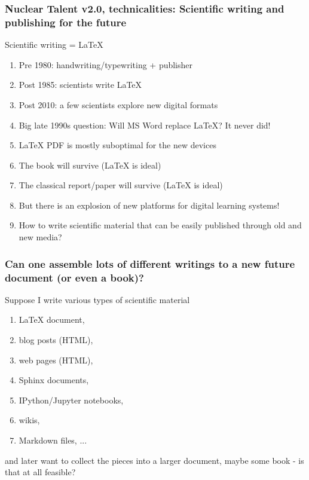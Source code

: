 \documentclass{beamer}
\begin{document}
\begin{frame}
\frametitle{Nuclear Talent v2.0, technicalities: Scientific writing and publishing for the future}

\begin{block}{}
Scientific writing = {\LaTeX}

\begin{enumerate}
\item Pre 1980: handwriting/typewriting + publisher

\item Post 1985: scientists write {\LaTeX}

\item Post 2010: a few scientists explore new digital formats

\item Big late 1990s question: Will MS Word replace {\LaTeX}? It never did!

\item {\LaTeX} PDF is mostly suboptimal for the new devices

\item The book will survive ({\LaTeX} is ideal)

\item The classical report/paper will survive ({\LaTeX} is ideal)

\item But there is an explosion of new platforms for digital learning systems!

\item How to write scientific material that can be easily published through old and new media?
\end{enumerate}

\noindent
\end{block}
\end{frame}

\begin{frame}
\frametitle{Can one assemble lots of different writings to a new future document (or even a book)?}

\begin{block}{}
Suppose I write various types of scientific material
\begin{enumerate}
\item {\LaTeX} document,

\item blog posts (HTML),

\item web pages (HTML),

\item Sphinx documents,

\item IPython/Jupyter notebooks,

\item wikis,

\item Markdown files, ...
\end{enumerate}

\noindent
and later want to collect the pieces into a larger document, maybe some book - is that at all feasible?

\end{block}
\end{frame}
\end{document}

